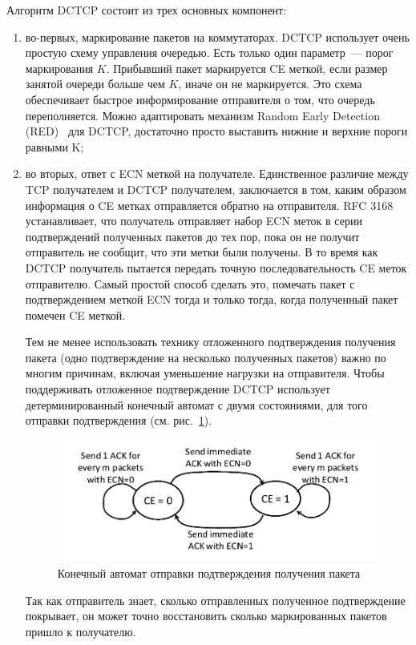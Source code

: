 \documentclass[14pt, a4paper,oneside]{extarticle}
\begin{document}
Алгоритм DCTCP состоит из трех основных компонент:
\begin{enumerate}

\item
во-первых, маркирование пакетов на коммутаторах.
DCTCP использует очень простую схему управления очередью. Есть только один параметр~--- порог маркирования $K$. Прибывший пакет маркируется CE меткой, если размер занятой очереди больше чем $K$, иначе он не маркируется. Это схема обеспечивает быстрое информирование отправителя о том, что очередь переполняется. Можно адаптировать механизм Random Early Detection (RED)~\cite{red} для DCTCP, достаточно просто выставить нижние и верхние пороги равными K;
\item
во вторых, ответ с ECN меткой на получателе. 
Единственное различие между TCP получателем и DCTCP получателем, заключается в том, каким образом информация о CE метках отправляется обратно на отправителя. RFC 3168 устанавливает, что получатель отправляет набор ECN меток в серии подтверждений полученных пакетов до тех пор, пока он не получит отправитель не сообщит, что эти метки были получены.
В то время как DCTCP получатель пытается передать точную последовательность CE меток отправителю. Самый простой способ сделать это, помечать пакет с подтверждением меткой ECN тогда и только тогда, когда полученный пакет помечен CE меткой.

Тем не менее использовать технику отложенного подтверждения получения пакета (одно подтверждение на несколько полученных пакетов) важно по многим причинам, включая уменьшение нагрузки на отправителя. Чтобы поддерживать отложенное подтверждение DCTCP использует детерминированный конечный автомат с двумя состояниями, для того отправки подтверждения (см. рис.~\ref{state_machine}).
\begin{figure}
\includegraphics[width=0.7\linewidth]{state_machine.png}
\caption{Конечный автомат отправки подтверждения получения пакета}
\label{state_machine}
\end{figure}
Так как отправитель знает, сколько отправленных полученное подтверждение покрывает, он может точно восстановить сколько маркированных пакетов пришло к получателю.


\end{enumerate}
\end{document}
